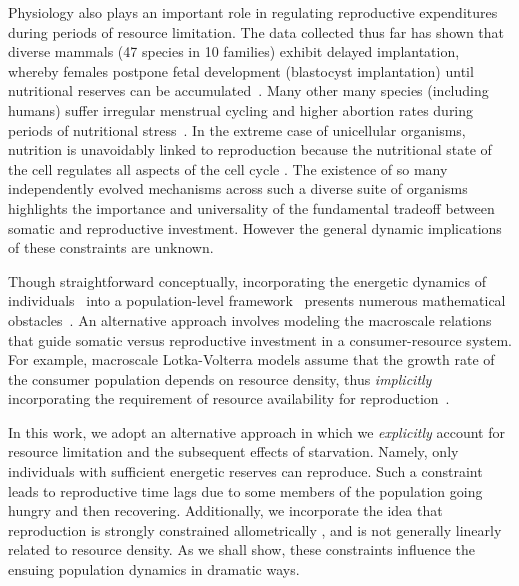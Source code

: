 \documentclass[twocolumn,preprintnumbers,amsmath,amssymb,superscriptaddress]{revtex4}
\begin{document}
Physiology also plays an important role in regulating reproductive
expenditures during periods of resource limitation.  The data collected thus
far has shown that diverse mammals (47 species in 10 families) exhibit
delayed implantation, whereby females postpone fetal development (blastocyst
implantation) until nutritional reserves can be
accumulated~\cite{Mead:1989dt,Sandell:1990kw}.  Many other many species
(including humans) suffer irregular menstrual cycling and higher abortion
rates during periods of nutritional stress~\cite{Bulik:1999eo,Trites:2003cc}.
In the extreme case of unicellular organisms, nutrition is unavoidably linked
to reproduction because the nutritional state of the cell regulates all
aspects of the cell cycle \cite{Glazier:2009hq}.  The existence of so many
independently evolved mechanisms across such a diverse suite of organisms
highlights the importance and universality of the fundamental tradeoff
between somatic and reproductive investment.  However the general dynamic
implications of these constraints are unknown.

Though straightforward conceptually, incorporating the energetic dynamics of
individuals~\cite{Kooi2000} into a population-level
framework~\cite{Kooi2000,Sousa:2010ez} presents numerous mathematical
obstacles~\cite{Diekmann:2010da}.  An alternative approach involves modeling
the macroscale relations that guide somatic versus reproductive investment in
a consumer-resource system.  For example, macroscale Lotka-Volterra models
assume that the growth rate of the consumer population depends on resource
density, thus \emph{implicitly} incorporating the requirement of resource
availability for reproduction~\cite{murdoch:2003}.

In this work, we adopt an alternative approach in which we \emph{explicitly}
account for resource limitation and the subsequent effects of starvation.
Namely, only individuals with sufficient energetic reserves can reproduce.
Such a constraint leads to reproductive time lags due to some members of the
population going hungry and then recovering.  Additionally, we incorporate
the idea that reproduction is strongly constrained allometrically
\cite{Kempes:2012hy}, and is not generally linearly related to resource
density.  As we shall show, these constraints influence the ensuing
population dynamics in dramatic ways.
\end{document}
